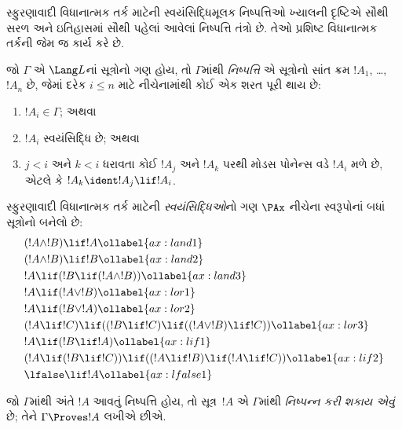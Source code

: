 \begingroup
\makeatletter{}\makeatother


\label{guunit:OLP-0497}


સ્ફુરણાવાદી વિધાનાત્મક તર્ક માટેની સ્વયંસિદ્ધિમૂલક
નિષ્પત્તિઓ ખ્યાલની દૃષ્ટિએ સૌથી સરળ અને ઇતિહાસમાં
સૌથી પહેલાં આવેલાં નિષ્પત્તિ તંત્રો છે. તેઓ પ્રશિષ્ટ
વિધાનાત્મક તર્કની જેમ જ કાર્ય કરે છે.

\begin{defn}[નિષ્પન્નક્ષમતા]
જો $\Gamma$ એ $\Lang L$નાં સૂત્રોનો ગણ હોય, તો
$\Gamma$માંથી \emph{નિષ્પત્તિ} એ સૂત્રોનો
સાંત ક્રમ $!A_1$, \dots,~$!A_n$ છે, જેમાં દરેક $i \le n$
માટે નીચેનામાંથી કોઈ એક શરત પૂરી થાય છે:
\begin{enumerate}
\item $!A_i \in \Gamma$; અથવા
\item $!A_i$ સ્વયંસિદ્ધિ છે; અથવા
\item $j < i$ અને $k < i$ ધરાવતા કોઈ $!A_j$ અને $!A_k$
  પરથી મોડસ પોનેન્સ વડે $!A_i$ મળે છે, એટલે કે
  $!A_k \ident !A_j \lif !A_i$.
\end{enumerate}
\end{defn}

\begin{defn}[સ્વયંસિદ્ધિઓ]
સ્ફુરણાવાદી વિધાનાત્મક તર્ક માટેની \emph{સ્વયંસિદ્ધિઓ}નો ગણ
$\PAx$ નીચેના સ્વરૂપોનાં બધાં સૂત્રોનો બનેલો છે:
\begin{align}
  & (!A \land !B) \lif !A \ollabel{ax:land1}\\
  & (!A \land !B) \lif !B \ollabel{ax:land2}\\
  & !A \lif (!B \lif (!A \land !B)) \ollabel{ax:land3}\\
  & !A \lif (!A \lor !B) \ollabel{ax:lor1}\\
  & !A \lif (!B \lor !A) \ollabel{ax:lor2}\\
  & (!A \lif !C) \lif ((!B \lif !C) \lif ((!A \lor !B) \lif !C)) \ollabel{ax:lor3}\\
  & !A \lif (!B \lif !A) \ollabel{ax:lif1}\\
  & (!A \lif (!B \lif !C)) \lif ((!A \lif !B) \lif (!A \lif !C)) \ollabel{ax:lif2}\\
  & \lfalse \lif !A \ollabel{ax:lfalse1}
\end{align}
\end{defn}

\begin{defn}[નિષ્પન્નક્ષમતા]
જો $\Gamma$માંથી અંતે $!A$ આવતું નિષ્પત્તિ હોય, તો
સૂત્ર~$!A$ એ $\Gamma$માંથી \emph{નિષ્પન્ન કરી શકાય એવું}
છે; તેને $\Gamma \Proves !A$ લખીએ છીએ.
\end{defn}

